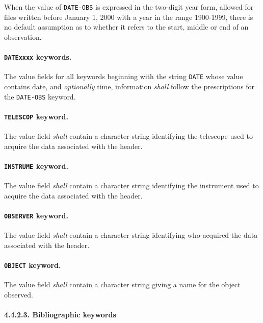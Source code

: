 \documentclass[onecolumn]{aa}
\begin{document}
 When the value of {\tt DATE-OBS} is expressed in the two-digit year 
 form, allowed for files
 written before January 1, 2000 with a year in the range 1900-1999, 
 there is no default assumption as to whether it refers to the start, 
 middle or end of an observation.

 \paragraph{{\tt DATExxxx} keywords.}
 The value fields for all keywords beginning with the string {\tt DATE}
 whose value contains date, and {\em optionally} time, information
 {\em shall} follow the prescriptions for the {\tt DATE-OBS}
 keyword.
                     
 \paragraph{{\tt TELESCOP} keyword.}
 The value field {\em shall} contain a character 
 string
 identifying the telescope used to acquire the data
 associated with the header.
  
 \paragraph{{\tt INSTRUME} keyword.}
 The value field {\em shall} contain a character 
 string
 identifying the instrument used to acquire the data
 associated with the header.
  
 \paragraph{{\tt OBSERVER} keyword.}
 The value field {\em shall} contain a character string
 identifying who acquired the data associated with the header. 
   
 \paragraph{{\tt OBJECT} keyword.}
 The value field {\em shall} contain a character 
 string
 giving a name for the object observed.
  
 

    \paragraph{4.4.2.3. Bibliographic keywords}
  \label{s:bibkeywords}
  
\end{document}
